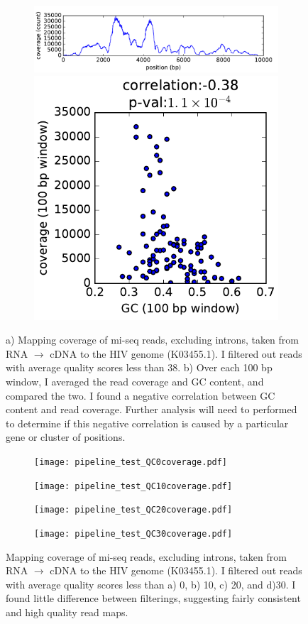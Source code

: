 \documentclass[article]{revtex4}
\begin{document}
\graphicspath{{"./"}}
\begin{figure}
\begin{subfigure}{1\textwidth}
\includegraphics[width=0.99\linewidth]{coverage.pdf}
\caption{}
\includegraphics[width=0.4\linewidth]{correlation.pdf}
\caption{}
\end{subfigure}
\caption{a) Mapping coverage of mi-seq reads, excluding introns, taken from RNA $\rightarrow$ cDNA to the HIV genome (K03455.1). I filtered out reads with average quality scores less than 38. b) Over each 100 bp window, I averaged the read coverage and GC content, and compared the two. I found a negative correlation between GC content and read coverage. Further analysis will need to performed to determine if this negative correlation is caused by a particular gene or cluster of positions. }\label{fig:QC38}
\end{figure}

\graphicspath{{"./STAR_out/"}}
\begin{figure}
\begin{subfigure}{1\textwidth}
\texttt{[image: pipeline\_test\_QC0coverage.pdf]}
\caption{}
\texttt{[image: pipeline\_test\_QC10coverage.pdf]}
\caption{}
\texttt{[image: pipeline\_test\_QC20coverage.pdf]}
\caption{}
\texttt{[image: pipeline\_test\_QC30coverage.pdf]}
\caption{}
\end{subfigure}
\caption{ Mapping coverage of mi-seq reads, excluding introns, taken from RNA $\rightarrow$ cDNA to the HIV genome (K03455.1). I filtered out reads with average quality scores less than a) 0, b) 10, c) 20, and d)30. I found little difference between filterings, suggesting fairly consistent and high quality read maps. }\label{fig:coverage}
\end{figure}
\end{document}

